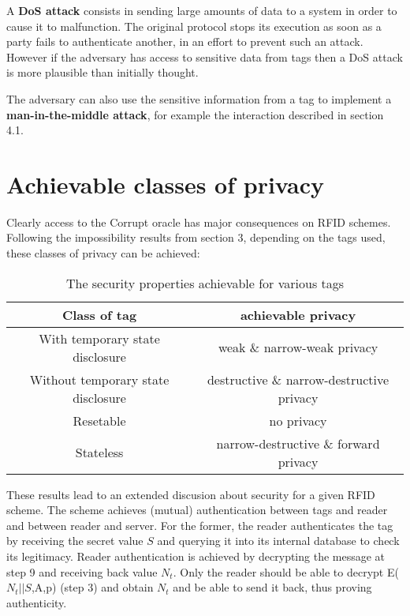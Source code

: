     A \textbf{DoS attack} consists in sending large amounts of data to a system in order to cause it to malfunction. The original protocol
    stops its execution as soon as a party fails to authenticate another, in an effort to prevent such an attack. However if the adversary 
    has access to sensitive data from tags then a DoS attack is more plausible than initially thought.

    The adversary can also use the sensitive information from a tag to implement a \textbf{man-in-the-middle attack}, for example the 
    interaction described in section 4.1.

\section{Achievable classes of privacy}

    Clearly access to the Corrupt oracle has major consequences on RFID schemes. Following the impossibility results from section 3, 
    depending on the tags used, these classes of privacy can be achieved:

    \begin{table}[H]
    \centering
    \caption{The security properties achievable for various tags}
    \begin{tabular}{| c | c |}
        \hline
        Class of tag & achievable privacy \\
        \hline
        With temporary state disclosure & weak \& narrow-weak privacy\\
        Without temporary state disclosure & destructive \& narrow-destructive privacy\\
        Resetable & no privacy \\
        Stateless & narrow-destructive \& forward privacy \\
        \hline
    \end{tabular}
    \end{table}

    These results lead to an extended discusion about security for a given RFID scheme. The \cite{BOM} scheme achieves (mutual)
    authentication between tags and reader and between reader and server. For the former, the reader authenticates the tag by
    receiving the secret value $S$ and querying it into its internal database to check its legitimacy. Reader authentication is
    achieved by decrypting the message at step 9 and receiving back value $N_t$. Only the reader should be able to decrypt 
    E($N_t||S$,A,p) (step 3) and obtain $N_t$ and be able to send it back, thus proving authenticity.
    
